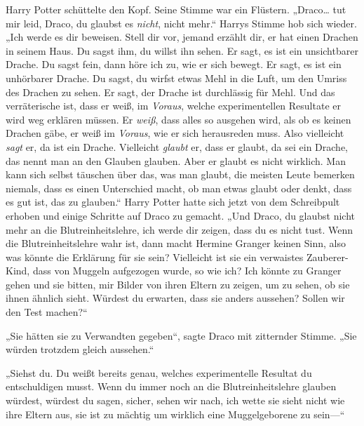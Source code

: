 Harry Potter schüttelte den Kopf. Seine Stimme war ein Flüstern. „Draco… tut mir leid, Draco, du glaubst es \emph{nicht}, nicht mehr.“ Harrys Stimme hob sich wieder. „Ich werde es dir beweisen. Stell dir vor, jemand erzählt dir, er hat einen Drachen in seinem Haus. Du sagst ihm, du willst ihn sehen. Er sagt, es ist ein unsichtbarer Drache. Du sagst fein, dann höre ich zu, wie er sich bewegt. Er sagt, es ist ein unhörbarer Drache. Du sagst, du wirfst etwas Mehl in die Luft, um den Umriss des Drachen zu sehen. Er sagt, der Drache ist durchlässig für Mehl. Und das verräterische ist, dass er weiß, im \emph{Voraus}, welche experimentellen Resultate er wird weg erklären müssen. Er \emph{weiß}, dass alles so ausgehen wird, als ob es keinen Drachen gäbe, er weiß im \emph{Voraus}, wie er sich herausreden muss. Also vielleicht \emph{sagt} er, da ist ein Drache. Vielleicht \emph{glaubt} er, dass er glaubt, da sei ein Drache, das nennt man an den Glauben glauben. Aber er glaubt es nicht wirklich. Man kann sich selbst täuschen über das, was man glaubt, die meisten Leute bemerken niemals, dass es einen Unterschied macht, ob man etwas glaubt oder denkt, dass es gut ist, das zu glauben.“ Harry Potter hatte sich jetzt von dem Schreibpult erhoben und einige Schritte auf Draco zu gemacht. „Und Draco, du glaubst nicht mehr an die Blutreinheitslehre, ich werde dir zeigen, dass du es nicht tust. Wenn die Blutreinheitslehre wahr ist, dann macht Hermine Granger keinen Sinn, also was könnte die Erklärung für sie sein? Vielleicht ist sie ein verwaistes Zauberer-Kind, dass von Muggeln aufgezogen wurde, so wie ich? Ich könnte zu Granger gehen und sie bitten, mir Bilder von ihren Eltern zu zeigen, um zu sehen, ob sie ihnen ähnlich sieht. Würdest du erwarten, dass sie anders aussehen? Sollen wir den Test machen?“

„Sie hätten sie zu Verwandten gegeben“, sagte Draco mit zitternder Stimme. „Sie würden trotzdem gleich aussehen.“

„Siehst du. Du weißt bereits genau, welches experimentelle Resultat du entschuldigen musst. Wenn du immer noch an die Blutreinheitslehre glauben würdest, würdest du sagen, sicher, sehen wir nach, ich wette sie sieht nicht wie ihre Eltern aus, sie ist zu mächtig um wirklich eine Muggelgeborene zu sein—“

